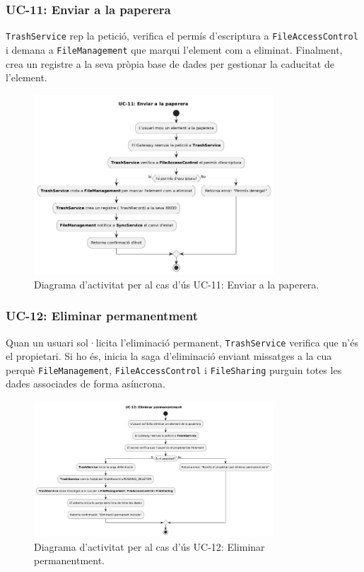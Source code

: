 \subsubsection{UC-11: Enviar a la paperera}
\texttt{TrashService} rep la petició, verifica el permís d'escriptura a \texttt{FileAccessControl} i demana a \texttt{FileManagement} que marqui l'element com a eliminat. Finalment, crea un registre a la seva pròpia base de dades per gestionar la caducitat de l'element.

\begin{figure}[H]
    \centering
    \includegraphics[width=0.8\textwidth]{Figures/ad_UC11.png}
    \caption{Diagrama d'activitat per al cas d'ús UC-11: Enviar a la paperera.}
    \label{fig:ad_uc11}
\end{figure}

\subsubsection{UC-12: Eliminar permanentment}
Quan un usuari sol·licita l'eliminació permanent, \texttt{TrashService} verifica que n'és el propietari. Si ho és, inicia la saga d'eliminació enviant missatges a la cua perquè \texttt{FileManagement}, \texttt{FileAccessControl} i \texttt{FileSharing} purguin totes les dades associades de forma asíncrona.

\begin{figure}[H]
    \centering
    \includegraphics[width=0.8\textwidth]{Figures/ad_UC12.png}
    \caption{Diagrama d'activitat per al cas d'ús UC-12: Eliminar permanentment.}
    \label{fig:ad_uc12}
\end{figure}


